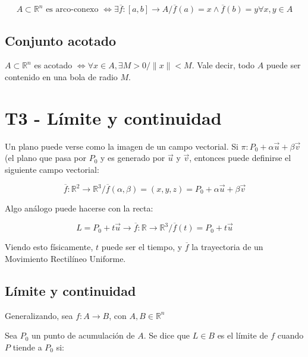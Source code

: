 \documentclass{article}
\renewcommand{\Bbb}{\mathbb}
\begin{document}
\begin{equation}
A \subset \Bbb R^n \text{ es arco-conexo } \Longleftrightarrow \exists \overline{f}: [a,b] \rightarrow A / \overline{f}(a) = x \wedge \overline{f}(b) = y \forall x,y \in A
\end{equation}

\subsection{Conjunto acotado}

$A \subset \Bbb R^n$ es acotado $\Longleftrightarrow \forall x \in A, \exists M > 0 / \|x\| < M$. Vale decir, todo $A$ puede ser contenido en una bola de radio $M$.

\section{T3 - Límite y continuidad}

Un plano puede verse como la imagen de un campo vectorial. Si $\pi: P_0 + \alpha \overrightarrow{u} + \beta \overrightarrow{v}$ (el plano que pasa por $P_0$ y es generado por $\overrightarrow{u}$ y $\overrightarrow{v}$, entonces puede definirse el siguiente campo vectorial:

\begin{equation}
\overline{f}: \Bbb R^2 \rightarrow \Bbb R^3 / \overline{f}(\alpha, \beta) = (x, y, z) = P_0 + \alpha \overrightarrow{u} + \beta \overrightarrow{v}
\end{equation}

Algo análogo puede hacerse con la recta:

\begin{equation}
L = P_0 + t \overrightarrow{u} \longrightarrow \overline{f}: \Bbb R \rightarrow \Bbb R^3 / \overline{f}(t) = P_0 + t \overrightarrow{u}
\end{equation}

Viendo esto físicamente, $t$ puede ser el tiempo, y $\overline{f}$ la trayectoria de un Movimiento Rectilíneo Uniforme.

\subsection{Límite y continuidad}

Generalizando, sea $f: A \rightarrow B$, con $A, B \in \Bbb R^n$

Sea $P_0$ un punto de acumulación de $A$. Se dice que $L \in B$ es el límite de $f$ cuando $P$ tiende a $P_0$ si:
\end{document}
